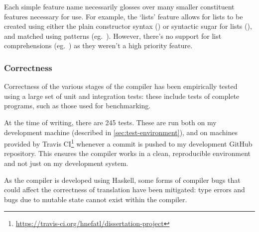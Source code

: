 \documentclass[dissertation.tex]{subfiles}
\begin{document}
{    

    Each simple feature name necessarily glosses over many smaller constituent features necessary for use. For example,
    the `lists' feature allows for lists to be created using either the plain constructor syntax
    () or syntactic sugar for lists (\haskell{[1,2,3]}), and matched using patterns (eg.\
    \haskell{[x,y] = [1,2]}). However, there's no support for list comprehensions (eg.\ \haskell{[f x | x <- [1,2,3],
    even x]}) as they weren't a high priority feature.


    
    \subsubsection{Correctness}
    {

        Correctness of the various stages of the compiler has been empirically tested using a large set of unit and
        integration tests: these include tests of complete programs, such as those used for benchmarking.
        
        At the time of writing, there are 245 tests. These are run both on my development machine
        (described in \ref{sec:test-environment}), and on machines provided by Travis
        CI\footnote{\url{https://travis-ci.org/hnefatl/dissertation-project}} whenever a commit is pushed to my
        development GitHub repository. This ensures the compiler works in a clean, reproducible environment and not just
        on my development system.

        As the compiler is developed using Haskell, some forms of compiler bugs that could affect the correctness of
        translation have been mitigated: type errors and bugs due to mutable state cannot exist within the compiler.
        
    }
}
\end{document}
